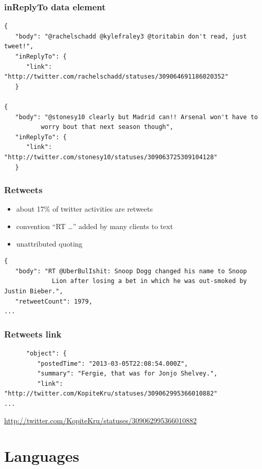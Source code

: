 \documentclass{beamer}
\begin{document}
\begin{frame}[fragile]
\frametitle{inReplyTo data element}
\begin{verbatim}
{
   "body": "@rachelschadd @kylefraley3 @toritabin don't read, just tweet!", 
   "inReplyTo": {
      "link": "http://twitter.com/rachelschadd/statuses/309064691186020352"
   }

{
   "body": "@stonesy10 clearly but Madrid can!! Arsenal won't have to 
          worry bout that next season though", 
   "inReplyTo": {
      "link": "http://twitter.com/stonesy10/statuses/309063725309104128"
   }
\end{verbatim}
\end{frame}



\begin{frame}[fragile]\frametitle{Retweets}
\begin{itemize}
\item about 17\% of twitter activities are retweets
\item convention ``RT \ldots'' added by many clients to text
\item unattributed quoting
\end{itemize}
\begin{verbatim}
{
   "body": "RT @UberBulIshit: Snoop Dogg changed his name to Snoop 
             Lion after losing a bet in which he was out-smoked by Justin Bieber.", 
   "retweetCount": 1979, 
...
\end{verbatim}
\end{frame}


\begin{frame}[fragile]\frametitle{Retweets link}
\begin{verbatim}
      "object": {
         "postedTime": "2013-03-05T22:08:54.000Z", 
         "summary": "Fergie, that was for Jonjo Shelvey.", 
         "link": "http://twitter.com/KopiteKru/statuses/309062995366010882"
...
\end{verbatim}
\href{http://twitter.com/KopiteKru/statuses/309062995366010882}{http://twitter.com/KopiteKru/statuses/309062995366010882}
\end{frame}         
         
\section{Languages}

\end{document}
